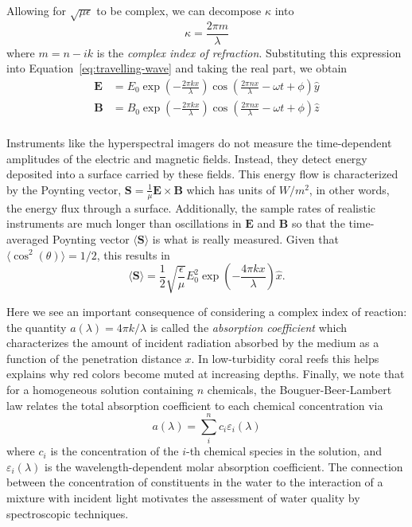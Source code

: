 Allowing for $\sqrt{\mu\epsilon}$ to be complex, we can decompose $\kappa$ into
\begin{equation}
  \kappa = \frac{2\pi m}{\lambda}
\end{equation}
where $m=n - ik$ is the \textit{complex index of refraction}. Substituting this expression
into Equation~\ref{eq:travelling-wave} and taking the real part, we obtain
\begin{equation}\label{eq:wave-real}
  \begin{aligned}
    \mathbf{E} &= E_0\exp\left(-\frac{2\pi k x}{\lambda}\right)\cos\left(  \frac{2\pi n x}{\lambda} - \omega t  + \phi \right) \hat{y} \\
    \mathbf{B} &= B_0\exp\left(-\frac{2\pi k x}{\lambda}\right)\cos\left(  \frac{2\pi n x}{\lambda} - \omega t  + \phi \right) \hat{z} \\
  \end{aligned}
\end{equation}

Instruments like the hyperspectral imagers do not measure
the time-dependent amplitudes of the electric and magnetic fields. Instead, they
detect energy deposited into a surface carried by these fields. This energy
flow is characterized by the Poynting vector, $\mathbf{S} =
\frac{1}{\mu}\mathbf{E}\times\mathbf{B}$ which has units of $W/m^2$, in other
words, the energy flux through a surface. Additionally, the sample rates of realistic
instruments are much longer than oscillations in $\mathbf{E}$ and $\mathbf{B}$ so
that the time-averaged Poynting vector $\langle
\mathbf{S} \rangle$ is what is really measured. Given that $\langle  \cos^2(\theta) \rangle =
1/2$, this results in
\begin{equation}
  \langle \mathbf{S} \rangle = \frac{1}{2}\sqrt{\frac{\epsilon}{\mu}}E_0^2\exp\left(-\frac{4\pi k x}{\lambda}\right) \hat{x}.
\end{equation}

Here we see an important consequence of considering a complex index of reaction:
the quantity $a(\lambda)=4\pi k/\lambda$ is called the \textit{absorption coefficient}
which characterizes the amount of incident radiation absorbed by the medium as a
function of the penetration distance $x$. In low-turbidity coral reefs this helps
explains why red colors become muted at increasing depths. Finally, we note that
for a homogeneous solution containing $n$ chemicals, the Bouguer-Beer-Lambert law
relates the total absorption coefficient to each chemical concentration via
\begin{equation}
  a(\lambda) = \sum_i^n c_i\varepsilon_i(\lambda)
\end{equation}
where $c_i$ is the concentration of the $i$-th chemical species in the solution,
and $\varepsilon_i(\lambda)$ is the wavelength-dependent molar absorption
coefficient. The connection between the concentration of constituents in the
water to the interaction of a mixture with incident light motivates the
assessment of water quality by spectroscopic techniques.

